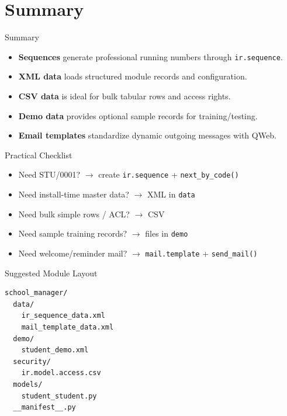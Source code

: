 \section{Summary}

\begin{frame}{Summary}
	\begin{itemize}
		\item \textbf{Sequences} generate professional running numbers through \texttt{ir.sequence}.
		\item \textbf{XML data} loads structured module records and configuration.
		\item \textbf{CSV data} is ideal for bulk tabular rows and access rights.
		\item \textbf{Demo data} provides optional sample records for training/testing.
		\item \textbf{Email templates} standardize dynamic outgoing messages with QWeb.
	\end{itemize}
\end{frame}

\begin{frame}{Practical Checklist}
	\begin{itemize}
		\item Need STU/0001? $\rightarrow$ create \texttt{ir.sequence} + \texttt{next\_by\_code()}
		\item Need install-time master data? $\rightarrow$ XML in \texttt{data}
		\item Need bulk simple rows / ACL? $\rightarrow$ CSV
		\item Need sample training records? $\rightarrow$ files in \texttt{demo}
		\item Need welcome/reminder mail? $\rightarrow$ \texttt{mail.template} + \texttt{send\_mail()}
	\end{itemize}
\end{frame}

\begin{frame}[fragile]{Suggested Module Layout}
\begin{lstlisting}
school_manager/
  data/
    ir_sequence_data.xml
    mail_template_data.xml
  demo/
    student_demo.xml
  security/
    ir.model.access.csv
  models/
    student_student.py
  __manifest__.py
\end{lstlisting}
\end{frame}
